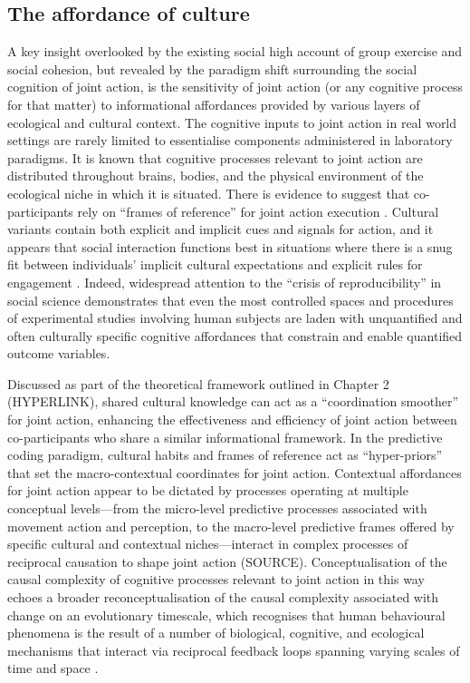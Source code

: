 \begin{CJK}{UTF8}{gbsn}
\subsection{The affordance of culture}
A key insight overlooked by the existing social high account of group exercise and social cohesion, but revealed by the paradigm shift surrounding the social cognition of joint action, is the sensitivity of joint action (or any cognitive process for that matter) to informational affordances provided by various layers of ecological and cultural context.  The cognitive inputs to joint action in real world settings are rarely limited to essentialise components administered in laboratory paradigms.  It is known that cognitive processes relevant to joint action are distributed throughout brains, bodies, and the physical environment of the ecological niche in which it is situated.  There is evidence to suggest that co-participants rely on ``frames of reference'' for joint action execution \citep{Ray2018}.  Cultural variants contain both explicit and implicit cues and signals for action, and it appears that social interaction functions best in situations where there is a snug fit between individuals' implicit cultural expectations and explicit rules for engagement \citep{Vollan2017}.  Indeed, widespread attention to the ``crisis of reproducibility'' in social science \citep{Earp2015,Rathmacher2017} demonstrates that even the most controlled spaces and procedures of experimental studies involving human subjects are laden with unquantified and often culturally specific cognitive affordances that constrain and enable quantified outcome variables.

Discussed as part of the theoretical framework outlined in Chapter 2 (HYPERLINK), shared cultural knowledge can act as a ``coordination smoother'' \citep{Vesper2017} for joint action, enhancing the effectiveness and efficiency of joint action between co-participants who share a similar informational framework.  In the predictive coding paradigm, cultural habits and frames of reference act as ``hyper-priors'' that set the macro-contextual coordinates for joint action\citep{Clark2013}.  Contextual affordances for joint action appear to be dictated by processes operating at multiple conceptual levels---from the micro-level predictive processes associated with movement action and perception, to the macro-level predictive frames offered by specific cultural and contextual niches---interact in complex processes of reciprocal causation to shape joint action (SOURCE).  Conceptualisation of the causal complexity of cognitive processes relevant to joint action in this way echoes a broader reconceptualisation of the causal complexity associated with change on an evolutionary timescale, which recognises that human behavioural phenomena is the result of a number of biological, cognitive, and ecological mechanisms that interact via reciprocal feedback loops spanning varying scales of time and space \citep{Fuentes2015}.


\end{CJK}
